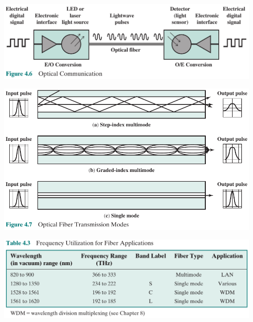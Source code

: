 \documentclass[pdflatex,compress]{beamer}
\begin{document}
\begin{frame}
	\begin{center}
		\includegraphics[width=\linewidth]{img/img14}
	\end{center}
\end{frame}

\begin{frame}
	\begin{center}
		\includegraphics[width=\linewidth]{img/img15}
	\end{center}
\end{frame}

\begin{frame}
	\begin{center}
		\includegraphics[width=\linewidth]{img/img16}
	\end{center}
\end{frame}
\end{document}
